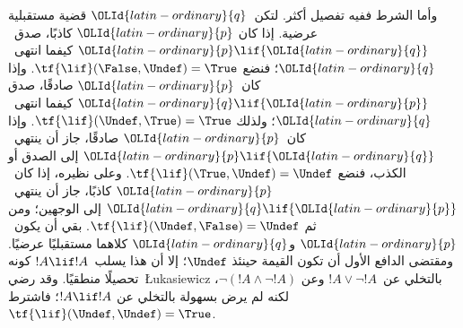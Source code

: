 \documentclass[../../../include/open-logic-section]{subfiles}
\begin{document}
وأما الشرط ففيه تفصيل أكثر. لتكن~${\OLId{latin-ordinary}{q}}$ قضية مستقبلية عرضية. إذا كان
${\OLId{latin-ordinary}{p}}$ كاذبًا، صدق~${\OLId{latin-ordinary}{p}} \lif {\OLId{latin-ordinary}{q}}$ كيفما انتهى~${\OLId{latin-ordinary}{q}}$؛ فنضع
$\tf{\lif}(\False, \Undef) = \True$. وإذا كان~${\OLId{latin-ordinary}{p}}$ صادقًا، صدق
${\OLId{latin-ordinary}{q}} \lif {\OLId{latin-ordinary}{p}}$ كيفما انتهى~${\OLId{latin-ordinary}{q}}$؛ ولذلك
$\tf{\lif}(\Undef, \True) = \True$. وإذا كان~${\OLId{latin-ordinary}{p}}$ صادقًا، جاز أن
ينتهي~${\OLId{latin-ordinary}{p}} \lif {\OLId{latin-ordinary}{q}}$ إلى الصدق أو الكذب، فنضع
$\tf{\lif}(\True, \Undef) = \Undef$. وعلى نظيره، إذا كان~${\OLId{latin-ordinary}{p}}$
كاذبًا، جاز أن ينتهي~${\OLId{latin-ordinary}{q}} \lif {\OLId{latin-ordinary}{p}}$ إلى الوجهين؛ ومن ثم
$\tf{\lif}(\Undef, \False) = \Undef$. بقي أن يكون~${\OLId{latin-ordinary}{p}}$ و${\OLId{latin-ordinary}{q}}$
كلاهما مستقبليًا عرضيًا. ومقتضى الدافع الأول أن تكون القيمة حينئذ
$\Undef$؛ إلا أن هذا يسلب~$!A \lif !A$ كونه تحصيلًا منطقيًا.
وقد رضي~\L ukasiewicz بالتخلي عن~$!A \lor \lnot !A$ وعن
$\lnot(!A \land \lnot !A)$، لكنه لم يرض بسهولة بالتخلي عن
$!A \lif !A$؛ فاشترط~$\tf{\lif}(\Undef, \Undef) = \True$.
\end{document}
